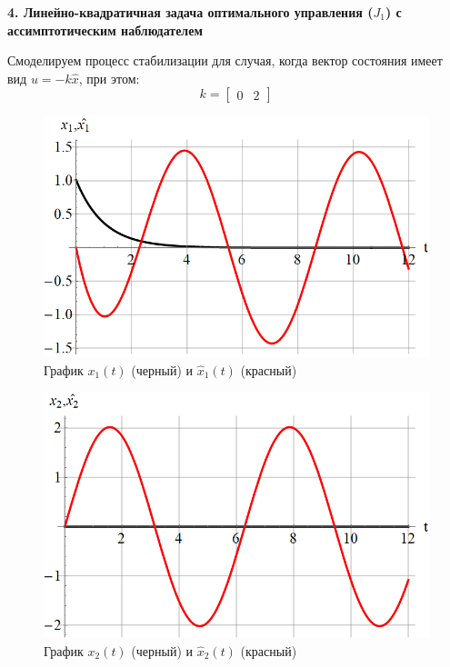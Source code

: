 \newpage

\textbf{4. Линейно-квадратичная задача оптимального управления ($ J_1 $) с ассимптотическим наблюдателем }

Смоделируем процесс стабилизации для случая, когда вектор состояния имеет вид $ u=-k\hat{x} $, при этом:
$$
k = \begin{bmatrix} 0 & 2 \end{bmatrix}
$$

\begin{figure}[h]
    \centering
    \includegraphics[scale=0.4]{chapter_x6/fig5.png}
    \caption{График $ x_1(t) $ (черный) и $ \hat{x}_1(t) $ (красный)}
    \label{}
\end{figure}

\begin{figure}[h]
    \centering
    \includegraphics[scale=0.4]{chapter_x6/fig6.png}
    \caption{График $ x_2(t) $ (черный) и $ \hat{x}_2(t) $ (красный)}
    \label{}
\end{figure}